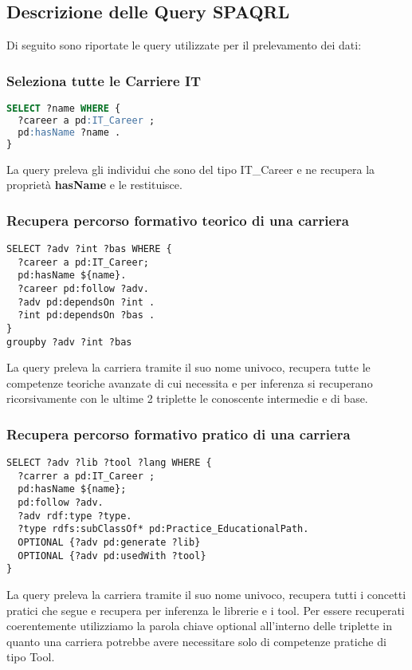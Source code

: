 \subsection{Descrizione delle Query SPAQRL}
Di seguito sono riportate le query utilizzate per il prelevamento dei dati:
\subsubsection{Seleziona tutte le Carriere IT}
\begin{lstlisting}[language=SQL]
  SELECT ?name WHERE { 
  ?career a pd:IT_Career ;
  pd:hasName ?name .
}
\end{lstlisting}
La query preleva gli individui che sono del tipo IT\_Career e ne recupera la proprietà \textbf{hasName} e le restituisce. 
\subsubsection{Recupera percorso formativo teorico di una carriera}
\begin{lstlisting}
SELECT ?adv ?int ?bas WHERE {
  ?career a pd:IT_Career;
  pd:hasName ${name}.
  ?career pd:follow ?adv.
  ?adv pd:dependsOn ?int .
  ?int pd:dependsOn ?bas .
}
groupby ?adv ?int ?bas 
\end{lstlisting}
La query preleva la carriera tramite il suo nome univoco, recupera tutte le competenze teoriche avanzate di cui necessita e per inferenza si recuperano ricorsivamente con le ultime 2 triplette le conoscente intermedie e di base.
\subsubsection{Recupera percorso formativo pratico di una carriera}
\begin{lstlisting}
SELECT ?adv ?lib ?tool ?lang WHERE {
  ?carrer a pd:IT_Career ;
  pd:hasName ${name};
  pd:follow ?adv.
  ?adv rdf:type ?type.
  ?type rdfs:subClassOf* pd:Practice_EducationalPath.
  OPTIONAL {?adv pd:generate ?lib}
  OPTIONAL {?adv pd:usedWith ?tool}
}
\end{lstlisting}
La query preleva la carriera tramite il suo nome univoco, recupera tutti i concetti pratici che segue e recupera per inferenza le librerie e i tool. Per essere recuperati coerentemente utilizziamo la parola chiave optional all'interno delle triplette in quanto una carriera potrebbe avere necessitare solo di competenze pratiche di tipo Tool.
